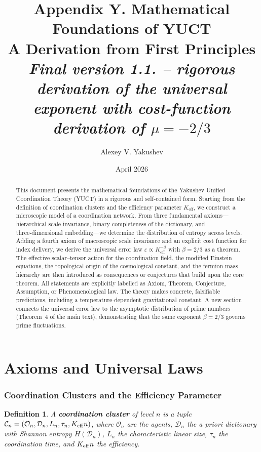 \documentclass[12pt,a4paper]{article}
\title{\Huge\textbf{Appendix Y. Mathematical Foundations of YUCT}\\[0.2cm]
	\Large A Derivation from First Principles\\[0.3cm]
	\large \textit{Final version 1.1. -- rigorous derivation of the universal exponent with cost-function derivation of 
		\(\mu = -2/3\)}}
\author{Alexey V. Yakushev}
\date{April 2026}
\newtheorem{definition}[theorem]{Definition}
\newcommand{\Keff}[1][]{K_{\mathrm{eff}\if\relax\detokenize{#1}\relax\else,#1\fi}}
\newcommand{\Dir}{\mathcal{D}}
\newcommand{\cC}{\mathcal{C}}
\begin{document}
	\maketitle
	
	\begin{abstract}
		This document presents the mathematical foundations of the Yakushev Unified Coordination Theory (YUCT) in a rigorous and self-contained form. Starting from the definition of coordination clusters and the efficiency parameter \(K_{\mathrm{eff}}\), we construct a microscopic model of a coordination network. From three fundamental axioms—hierarchical scale invariance, binary completeness of the dictionary, and three‑dimensional embedding—we determine the distribution of entropy across levels. Adding a fourth axiom of macroscopic scale invariance and an explicit cost function for index delivery, we derive the universal error law \(\varepsilon \propto K_{\mathrm{eff}}^{-\beta}\) with \(\beta = 2/3\) as a theorem. The effective scalar–tensor action for the coordination field, the modified Einstein equations, the topological origin of the cosmological constant, and the fermion mass hierarchy are then introduced as consequences or conjectures that build upon the core theorem. All statements are explicitly labelled as Axiom, Theorem, Conjecture, Assumption, or Phenomenological law. The theory makes concrete, falsifiable predictions, including a temperature‑dependent gravitational constant. A new section connects the universal error law to the asymptotic distribution of prime numbers (Theorem~4 of the main text), demonstrating that the same exponent \(\beta = 2/3\) governs prime fluctuations.
	\end{abstract}
	
	\tableofcontents
	\newpage
	
	\part{Axioms and Universal Laws}
	
	\section{Coordination Clusters and the Efficiency Parameter}
	\begin{definition}
		A \textbf{coordination cluster} of level \(n\) is a tuple \(\cC_n = (\mathcal{O}_n, \Dir_n, L_n, \tau_n, \Keff{n})\), where \(\mathcal{O}_n\) are the agents, \(\Dir_n\) the a priori dictionary with Shannon entropy \(H(\Dir_n)\), \(L_n\) the characteristic linear size, \(\tau_n\) the coordination time, and \(\Keff{n}\) the efficiency.
	\end{definition}
	
\end{document}
